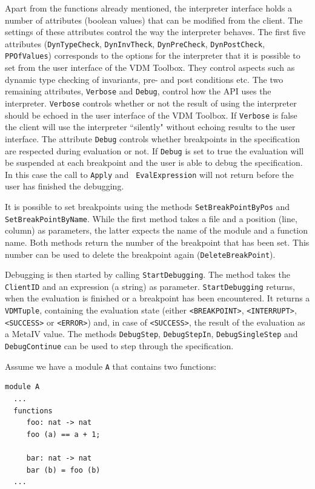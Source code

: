 \documentclass[\pformat,12pt]{article}
\begin{document}
Apart from the functions already mentioned, the interpreter interface
holds a number of attributes (boolean values) that can be modified
from the client. The settings of these attributes control the way the
interpreter behaves.  The first five attributes ({\tt DynTypeCheck},
{\tt DynInvTheck}, {\tt DynPreCheck}, {\tt DynPostCheck}, {\tt
  PPOfValues}) corresponds to the options for the interpreter that it
is possible to set from the user interface of the VDM Toolbox. They
control aspects such as dynamic type checking of invariants, pre- and
post conditions etc.  The two remaining attributes, {\tt Verbose} and
{\tt Debug}, control how the API uses the interpreter. {\tt Verbose}
controls whether or not the result of using the interpreter should be
echoed in the user interface of the VDM Toolbox. If {\tt Verbose} is
false the client will use the interpreter ``silently" without echoing 
results to the user interface.  The attribute {\tt Debug} controls
whether breakpoints in the specification are respected during
evaluation or not. If {\tt Debug} is set to true the evaluation will
be suspended at each breakpoint and the user is able to debug the
specification. In this case the call to {\tt Apply} and {\tt
  EvalExpression} will not return before the user has finished the
debugging. 

It is possible to set breakpoints using the methods {\tt SetBreakPointByPos}
and {\tt SetBreakPointByName}. While the first method takes a file and
a position (line, column) as parameters, the latter expects the name of the
module and a function name. Both methods return the number of the breakpoint
that has been set. This number can be used to delete the breakpoint again
({\tt DeleteBreakPoint}).

Debugging is then started by calling {\tt StartDebugging}. The method takes
the {\tt ClientID} and an expression (a string) as parameter. {\tt StartDebugging}
returns, when the evaluation is finished or a breakpoint has been encountered.
It returns a {\tt VDMTuple}, containing the evaluation state (either
{\tt <BREAKPOINT>}, {\tt <INTERRUPT>}, {\tt <SUCCESS>} or {\tt <ERROR>}) and,
in case of {\tt <SUCCESS>}, the result of the evaluation as a MetaIV value.
The methods {\tt DebugStep}, {\tt DebugStepIn}, {\tt DebugSingleStep} and 
{\tt DebugContinue} can be used to step through the specification.

Assume we have a module \texttt{A} that contains two functions:

\begin{verbatim}
module A
  ...
  functions
     foo: nat -> nat
     foo (a) == a + 1;

     bar: nat -> nat
     bar (b) = foo (b)
  ...
\end{verbatim}
\end{document}
